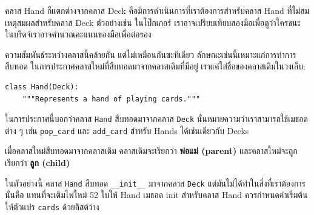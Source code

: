
คลาส Hand ก็แตกต่างจากคลาส Deck คือมีการดำเนินการที่เราต้องการสำหรับคลาส Hand ที่ไม่สมเหตุสมผลสำหรับคลาส Deck 
ตัวอย่างเช่น ในโป๊กเกอร์ เราอาจเปรียบเทียบสองมือเพื่อดูว่าใครชนะ ในบริดจ์เราอาจคำนวณคะแนนของมือเพื่อต่อรอง



ความสัมพันธ์ระหว่างคลาสนี้คล้ายกัน แต่ไม่เหมือนกันซะทีเดียว
ลักษณะเช่นนี้เหมาะแก่การทำการสืบทอด 
ในการประกาศคลาสใหม่ที่สืบทอดมาจากคลาสเดิมที่มีอยู่ 
เราแค่ใส่ชื่อของคลาสเดิมในวงเล็บ:


\begin{verbatim}
class Hand(Deck):
    """Represents a hand of playing cards."""
\end{verbatim}
%

ในการประกาศนี้บอกว่าคลาส {\tt Hand} สืบทอดมาจากคลาส {\tt Deck} นั่นหมายความว่าเราสามารถใช้เมธอดต่าง ๆ 
เช่น \verb"pop_card" และ \verb"add_card" สำหรับ Hands ได้เช่นเดียวกับ Decks

เมื่อคลาสใหม่สืบทอดมาจากคลาสเดิม คลาสเดิมจะเรียกว่า {\bf พ่อแม่ (parent)} และคลาสใหม่จะถูกเรียกว่า {\bf ลูก (child)}



ในตัวอย่างนี้ คลาส {\tt Hand} สืบทอด \verb"__init__" มาจากคลาส {\tt Deck} แต่มันไม่ได้ทำในสิ่งที่เราต้องการ 
นั่นคือ แทนที่จะเติมไพ่ใหม่ 52 ใบให้ Hand เมธอด init สำหรับคลาส Hand ควรกำหนดค่าเริ่มต้นให้ตัวแปร {\tt cards} ด้วยลิสต์ว่าง

